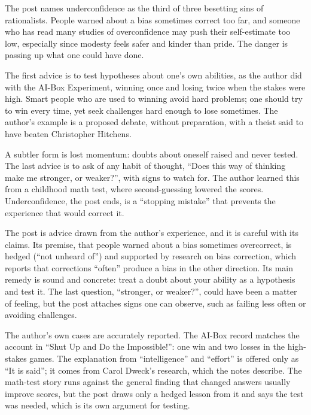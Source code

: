 \begin{afterword}
\summaryhead

The post names underconfidence as the third of three besetting sins of rationalists. People warned about a bias sometimes correct too far, and someone who has read many studies of overconfidence may push their self-estimate too low, especially since modesty feels safer and kinder than pride. The danger is passing up what one could have done.

The first advice is to test hypotheses about one's own abilities, as the author did with the AI-Box Experiment, winning once and losing twice when the stakes were high. Smart people who are used to winning avoid hard problems; one should try to win every time, yet seek challenges hard enough to lose sometimes. The author's example is a proposed debate, without preparation, with a theist said to have beaten Christopher Hitchens.

A subtler form is lost momentum: doubts about oneself raised and never tested. The last advice is to ask of any habit of thought, ``Does this way of thinking make me stronger, or weaker?'', with signs to watch for. The author learned this from a childhood math test, where second-guessing lowered the scores. Underconfidence, the post ends, is a ``stopping mistake'' that prevents the experience that would correct it.

\responsehead

The post is advice drawn from the author's experience, and it is careful with its claims. Its premise, that people warned about a bias sometimes overcorrect, is hedged (``not unheard of'') and supported by research on bias correction, which reports that corrections ``often'' produce a bias in the other direction. Its main remedy is sound and concrete: treat a doubt about your ability as a hypothesis and test it. The last question, ``stronger, or weaker?'', could have been a matter of feeling, but the post attaches signs one can observe, such as failing less often or avoiding challenges.

The author's own cases are accurately reported. The AI-Box record matches the account in ``Shut Up and Do the Impossible!'': one win and two losses in the high-stakes games. The explanation from ``intelligence'' and ``effort'' is offered only as ``It is said''; it comes from Carol Dweck's research, which the notes describe. The math-test story runs against the general finding that changed answers usually improve scores, but the post draws only a hedged lesson from it and says the test was needed, which is its own argument for testing.


\end{afterword}
